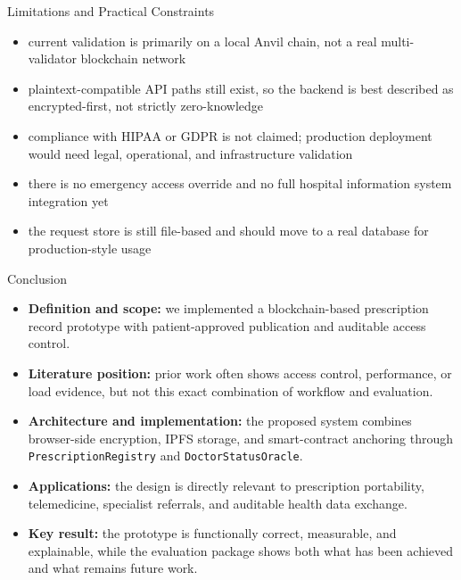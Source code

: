 \documentclass[10pt]{beamer}
\begin{document}
\begin{frame}{Limitations and Practical Constraints}
\small
\begin{itemize}
  \item current validation is primarily on a local Anvil chain, not a real multi-validator blockchain network
  \item plaintext-compatible API paths still exist, so the backend is best described as encrypted-first, not strictly zero-knowledge
  \item compliance with HIPAA or GDPR is not claimed; production deployment would need legal, operational, and infrastructure validation
  \item there is no emergency access override and no full hospital information system integration yet
  \item the request store is still file-based and should move to a real database for production-style usage
\end{itemize}
\end{frame}

\begin{frame}{Conclusion}
\small
\begin{itemize}
  \item \textbf{Definition and scope:} we implemented a blockchain-based prescription record prototype with patient-approved publication and auditable access control.
  \item \textbf{Literature position:} prior work often shows access control, performance, or load evidence, but not this exact combination of workflow and evaluation.
  \item \textbf{Architecture and implementation:} the proposed system combines browser-side encryption, IPFS storage, and smart-contract anchoring through \texttt{PrescriptionRegistry} and \texttt{DoctorStatusOracle}.
  \item \textbf{Applications:} the design is directly relevant to prescription portability, telemedicine, specialist referrals, and auditable health data exchange.
  \item \textbf{Key result:} the prototype is functionally correct, measurable, and explainable, while the evaluation package shows both what has been achieved and what remains future work.
\end{itemize}
\end{frame}
\end{document}
